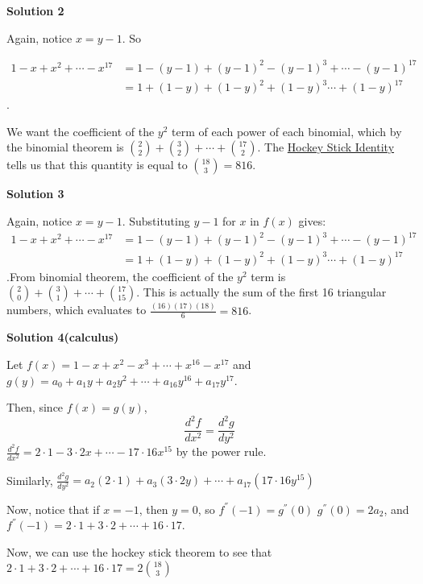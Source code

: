 \begin{enumerate}
 



\textbf{Solution 2}

Again, notice $x = y - 1$. So

 
 \begin{align*}1 - x + x^2 + \cdots - x^{17} & = 1 - (y - 1) + (y - 1)^2 - (y - 1)^3 + \cdots - (y - 1)^{17} \\ & = 1 + (1 - y) + (1 - y)^2 + (1 - y)^3 \cdots + (1 - y)^{17}\end{align*}
.

 We want the coefficient of the $y^2$ term of each power of each binomial, which by the binomial theorem is ${2\choose 2} + {3\choose 2} + \cdots + {17\choose 2}$. The \href{https://artofproblemsolving.com/wiki/index.php?title=Hockey\_Stick\_Identity}{Hockey Stick Identity} tells us that this quantity is equal to ${18\choose 3} = \boxed{816}$.

 



\textbf{Solution 3}

Again, notice $x=y-1$. Substituting $y-1$ for $x$ in $f(x)$ gives: 
 \begin{align*}1 - x + x^2 + \cdots - x^{17} & = 1 - (y - 1) + (y - 1)^2 - (y - 1)^3 + \cdots - (y - 1)^{17} \\ & = 1 + (1 - y) + (1 - y)^2 + (1 - y)^3 \cdots + (1 - y)^{17}\end{align*}
.From binomial theorem, the coefficient of the $y^2$ term is ${2\choose 0} + {3\choose 1} + \cdots + {17\choose 15}$. This is actually the sum of the first 16 triangular numbers, which evaluates to $\frac{(16)(17)(18)}{6} = \boxed{816}$.

 



\textbf{Solution 4(calculus)}

Let $f(x)=1-x+x^2-x^3+\cdots+x^{16}-x^{17}$ and $g(y)=a_0+a_1y+a_2y^2+\cdots +a_{16}y^{16}+a_{17}y^{17}$.

 Then, since $f(x)=g(y)$,
 \[\frac{d^2f}{dx^2}=\frac{d^2g}{dy^2}\]$\frac{d^2f}{dx^2} = 2\cdot 1 - 3\cdot 2x+\cdots-17\cdot 16x^{15}$ by the power rule.

 Similarly, $\frac{d^2g}{dy^2} = a_2(2\cdot 1) + a_3(3\cdot 2y)+\cdots+a_{17}(17\cdot 16y^{15})$

 Now, notice that if $x = -1$, then $y = 0$, so $f^{''}(-1) = g^{''}(0)$
$g^{''}(0)= 2a_2$, and $f^{''}(-1) = 2\cdot 1 + 3\cdot 2 +\cdots + 16\cdot 17$.

 Now, we can use the hockey stick theorem to see that $2\cdot 1 + 3\cdot 2 +\cdots + 16\cdot 17 = 2\binom{18}{3}$


\end{enumerate}
